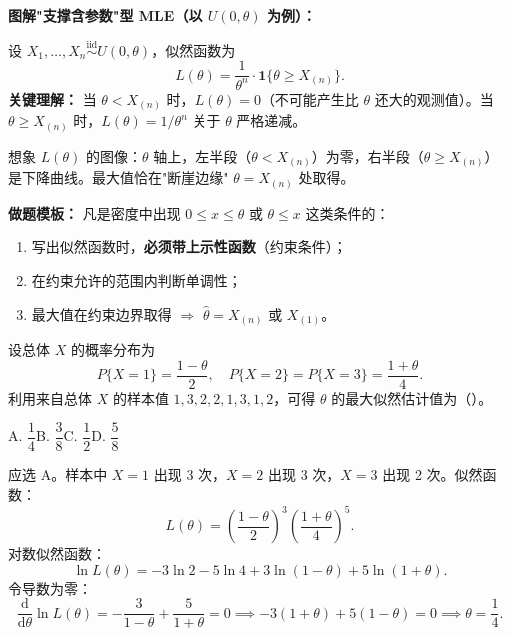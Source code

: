 ﻿\documentclass[lang=cn,11pt]{elegantbook}
\begin{document}
\begin{note}
\textbf{图解"支撑含参数"型 MLE（以 $U(0,\theta)$ 为例）：}

设 $X_1,\dots,X_n\overset{\text{iid}}{\sim}U(0,\theta)$，似然函数为
\[
L(\theta)=\frac{1}{\theta^n}\cdot\mathbf{1}\{\theta\geq X_{(n)}\}.
\]
\textbf{关键理解：} 当 $\theta < X_{(n)}$ 时，$L(\theta)=0$（不可能产生比 $\theta$ 还大的观测值）。当 $\theta\geq X_{(n)}$ 时，$L(\theta)=1/\theta^n$ 关于 $\theta$ 严格递减。

想象 $L(\theta)$ 的图像：$\theta$ 轴上，左半段（$\theta<X_{(n)}$）为零，右半段（$\theta\geq X_{(n)}$）是下降曲线。最大值恰在"断崖边缘" $\theta=X_{(n)}$ 处取得。

\textbf{做题模板：} 凡是密度中出现 $0\leq x\leq\theta$ 或 $\theta\leq x$ 这类条件的：
\begin{enumerate}
    \item 写出似然函数时，\textbf{必须带上示性函数}（约束条件）；
    \item 在约束允许的范围内判断单调性；
    \item 最大值在约束边界取得 $\Rightarrow$ $\hat\theta=X_{(n)}$ 或 $X_{(1)}$。
\end{enumerate}
\end{note}

\begin{exercise}[离散分布的最大似然估计] \label{ex:mle_01}
设总体 \(X\) 的概率分布为
\[
P\{X=1\}=\frac{1-\theta}{2},\quad P\{X=2\}=P\{X=3\}=\frac{1+\theta}{4}.
\]
利用来自总体 \(X\) 的样本值 \(1,3,2,2,1,3,1,2\)，可得 \(\theta\) 的最大似然估计值为（\quad）。\par
A. \(\dfrac{1}{4}\)\qquad B. \(\dfrac{3}{8}\)\qquad C. \(\dfrac{1}{2}\)\qquad D. \(\dfrac{5}{8}\)
\end{exercise}
\begin{solution}
应选 A。样本中 \(X=1\) 出现 3 次，\(X=2\) 出现 3 次，\(X=3\) 出现 2 次。似然函数：
\[
L(\theta)=\left(\frac{1-\theta}{2}\right)^{\!3}\left(\frac{1+\theta}{4}\right)^{\!5}.
\]
对数似然函数：
\[
\ln L(\theta)=-3\ln 2-5\ln 4+3\ln(1-\theta)+5\ln(1+\theta).
\]
令导数为零：
\[
\frac{\mathrm{d}}{\mathrm{d}\theta}\ln L(\theta)=-\frac{3}{1-\theta}+\frac{5}{1+\theta}=0
\implies -3(1+\theta)+5(1-\theta)=0
\implies \theta=\frac{1}{4}.
\]
\end{solution}
\end{document}
